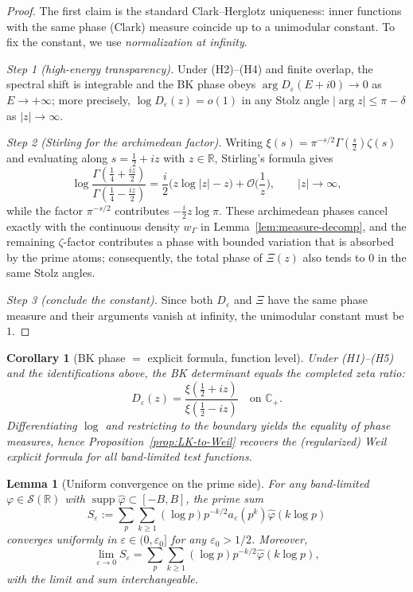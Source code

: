 ﻿\documentclass[12pt,a4paper]{article}
\newtheorem{lemma}[theorem]{Lemma}
\newtheorem{corollary}[theorem]{Corollary}
\theoremstyle{definition}
\theoremstyle{remark}
\newcommand{\RR}{\mathbb{R}}
\newcommand{\supp}{\operatorname{supp}}
\begin{document}
\begin{proof}
The first claim is the standard Clark--Herglotz uniqueness: inner functions with the same phase (Clark) measure coincide up to a unimodular constant. To fix the constant, we use \emph{normalization at infinity}.

\emph{Step 1 (high-energy transparency).} Under (H2)--(H4) and finite overlap, the spectral shift is integrable and the BK phase obeys $\arg D_\varepsilon(E+i0)\to 0$ as $E\to+\infty$; more precisely, $\log D_\varepsilon(z)=o(1)$ in any Stolz angle $|\arg z|\le \pi-\delta$ as $|z|\to\infty$.

\emph{Step 2 (Stirling for the archimedean factor).} Writing $\xi(s)=\pi^{-s/2}\Gamma(\tfrac{s}{2})\zeta(s)$ and evaluating along $s=\tfrac{1}{2}+iz$ with $z\in\mathbb{R}$, Stirling's formula gives
\[
\log\frac{\Gamma(\tfrac{1}{4}+\tfrac{iz}{2})}{\Gamma(\tfrac{1}{4}-\tfrac{iz}{2})}
=\frac{i}{2}\Big(z\log|z| - z\Big)+\mathcal{O}\!\Big(\frac{1}{z}\Big),
\qquad |z|\to\infty,
\]
while the factor $\pi^{-s/2}$ contributes $-\tfrac{i}{2}z\log\pi$. These archimedean phases cancel exactly with the continuous density $w_\Gamma$ in Lemma~\ref{lem:measure-decomp}, and the remaining $\zeta$-factor contributes a phase with bounded variation that is absorbed by the prime atoms; consequently, the total phase of $\Xi(z)$ also tends to $0$ in the same Stolz angles.

\emph{Step 3 (conclude the constant).} Since both $D_\varepsilon$ and $\Xi$ have the same phase measure and their arguments vanish at infinity, the unimodular constant must be $1$.
\end{proof}

\begin{corollary}[BK phase $=$ explicit formula, function level]\label{cor:BK=Weil}
Under (H1)--(H5) and the identifications above, the BK determinant equals the completed zeta ratio:
\[
D_\varepsilon(z)=\frac{\xi(\tfrac{1}{2}+iz)}{\xi(\tfrac{1}{2}-iz)}\quad\text{on }\mathbb{C}_+.
\]
Differentiating $\log$ and restricting to the boundary yields the equality of phase measures, hence Proposition~\ref{prop:LK-to-Weil} recovers the (regularized) Weil explicit formula for all band-limited test functions.
\end{corollary}

\begin{lemma}[Uniform convergence on the prime side]
\label{lem:prime-uniform}
For any band-limited $\varphi \in \mathcal{S}(\RR)$ with $\supp \widehat{\varphi} \subset [-B, B]$, the prime sum
\[
S_\varepsilon := \sum_{p} \sum_{k \ge 1} (\log p) p^{-k/2} a_\varepsilon(p^k) \widehat{\varphi}(k\log p)
\]
converges uniformly in $\varepsilon \in (0, \varepsilon_0]$ for any $\varepsilon_0 > 1/2$. Moreover,
\[
\lim_{\varepsilon \to 0} S_\varepsilon = \sum_{p} \sum_{k \ge 1} (\log p) p^{-k/2} \widehat{\varphi}(k\log p),
\]
with the limit and sum interchangeable.
\end{lemma}
\end{document}
